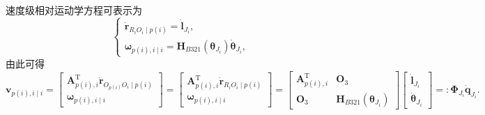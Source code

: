 速度级相对运动学方程可表示为
\begin{equation}\label{eq:10.12}
  \begin{cases}
    \dot{\boldsymbol{r}}_{R_i O_i \mid p(i)} = \dot{\boldsymbol{l}}_{J_i}, \\
    \boldsymbol{\omega}_{p(i),i \mid i} = \boldsymbol{H}_{B321}(\boldsymbol{\theta}_{J_i}) \dot{\boldsymbol{\theta}}_{J_i},
  \end{cases}
\end{equation}
由此可得
\begin{equation}\label{eq:10.13}
  \boldsymbol{v}_{p(i),i \mid i} = \begin{bmatrix} \boldsymbol{A}_{p(i),i}^{\mathrm{T}} \dot{\boldsymbol{r}}_{O_{p(i)} O_i \mid p(i)} \\ \boldsymbol{\omega}_{p(i),i \mid i} \end{bmatrix}
  = \begin{bmatrix} \boldsymbol{A}_{p(i),i}^{\mathrm{T}} \dot{\boldsymbol{r}}_{R_i O_i \mid p(i)} \\ \boldsymbol{\omega}_{p(i),i \mid i} \end{bmatrix}
  = \begin{bmatrix} \boldsymbol{A}_{p(i),i}^{\mathrm{T}} & \boldsymbol{O}_3 \\ \boldsymbol{O}_3 & \boldsymbol{H}_{B321}(\boldsymbol{\theta}_{J_i}) \end{bmatrix}
  \begin{bmatrix} \dot{\boldsymbol{l}}_{J_i} \\ \dot{\boldsymbol{\theta}}_{J_i} \end{bmatrix}
  =: \boldsymbol{\Phi}_{J_i} \dot{\boldsymbol{q}}_{J_i}.
\end{equation}

